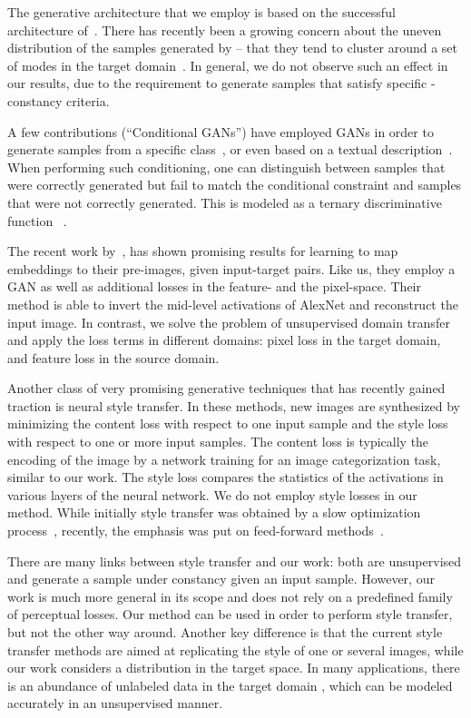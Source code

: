 \documentclass{article} \usepackage{iclr2017_conference,times}
\begin{document}
The generative architecture that we employ is based on the successful architecture of~\citet{dcgan}. There has recently been a growing concern about the uneven distribution of the samples generated by  -- that they tend to cluster around a set of modes in the target domain~\citep{gantricks}. In general, we do not observe such an effect in our results, due to the requirement to generate samples that satisfy specific -constancy criteria. 

A few contributions (``Conditional GANs'') have employed GANs in order to generate samples from a specific class~\citep{mirza2014conditional}, or even based on a textual description~\citep{RAYLLS16}. When performing such conditioning, one can distinguish between samples that were correctly generated but fail to match the conditional constraint and samples that were not correctly generated. This is modeled as a ternary discriminative function ~\citep{RAYLLS16,introspectivegan}.

The recent work by~\citet{deepsim}, has shown promising results for learning to map embeddings to their pre-images, given input-target pairs. Like us, they employ a GAN as well as additional losses in the feature- and the pixel-space. Their method is able to invert the mid-level activations of AlexNet and reconstruct the input image. In contrast, we solve the problem of unsupervised domain transfer and apply the loss terms in different domains: pixel loss in the target domain, and feature loss in the source domain. 

Another class of very promising generative techniques that has recently gained traction is neural style transfer. In these methods, new images are synthesized by minimizing the content loss with respect to one input sample and the style loss with respect to one or more input samples. The content loss is typically the encoding of the image by a network training for an image categorization task, similar to our work. The style loss compares the statistics of the activations in various layers of the neural network. We do not employ style losses in our method. While initially style transfer was obtained by a slow optimization process~\citep{styletransfer}, recently, the emphasis was put on feed-forward methods~\citep{ulyanov16texture,Johnson2016Perceptual}. 

There are many links between style transfer and our work: both are unsupervised and generate a sample under  constancy given an input sample. However, our work is much more general in its scope and does not rely on a predefined family of perceptual losses. Our method can be used in order to perform style transfer, but not the other way around.  Another key difference is that the current style transfer methods are aimed at replicating the style of one or several images, while our work considers a distribution in the target space. In many applications, there is an abundance of unlabeled data in the target domain , which can be modeled accurately in an unsupervised manner.
\end{document}
